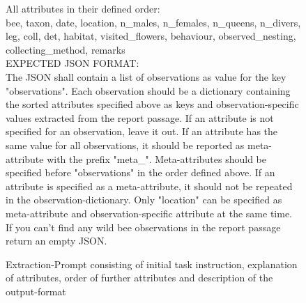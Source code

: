 \begin{figure}[H]
{{            All attributes in their defined order:\\
            bee, taxon, date, location, n\_males, n\_females, n\_queens, n\_divers, leg, coll, det, habitat, visited\_flowers, behaviour, observed\_nesting, collecting\_method, remarks\\
            
            EXPECTED JSON FORMAT:\\
            
            The JSON shall contain a list of observations as value for the key "observations". Each observation should be a dictionary containing the sorted attributes specified above as keys and observation-specific values extracted from the report passage. If an attribute is not specified for an observation, leave it out. If an attribute has the same value for all observations, it should be reported as meta-attribute with the prefix "meta\_". Meta-attributes should be specified before "observations" in the order defined above. If an attribute is specified as a meta-attribute, it should not be repeated in the observation-dictionary. Only "location" can be specified as meta-attribute and observation-specific attribute at the same time. If you can't find any wild bee observations in the report passage return an empty JSON.}
        }%
    \caption{Extraction-Prompt consisting of initial task instruction, explanation of attributes, order of further attributes and description of the output-format}
\end{figure}